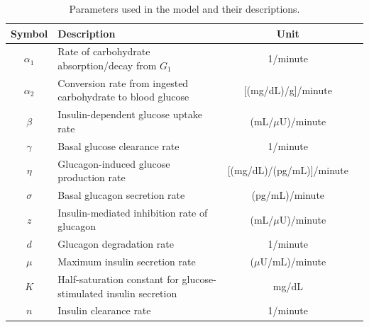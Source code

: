 \documentclass[a4paper,fleqn]{cas-sc}
\numberwithin{equation}{section}
\numberwithin{equation}{section}
\newcommand{\1}{\boldsymbol{1}}
\newcommand{\0}{\boldsymbol{0}}
\begin{document}

\begin{table}[H]
    \centering
    \begin{tabular}{cp{9cm}cc}
        \hline
        \textbf{Symbol} & \textbf{Description} & \textbf{Unit} \\
        \hline
        $\alpha_1$ & Rate of carbohydrate absorption/decay from $G_1$ & 1/minute \\

        $\alpha_2$ & Conversion rate from ingested carbohydrate to blood glucose & [(mg/dL)/g]/minute \\

        $\beta$ & Insulin-dependent glucose uptake rate & (mL/\(\mu\)U)/minute \\

        $\gamma$ & Basal glucose clearance rate & 1/minute \\

        $\eta$ & Glucagon-induced glucose production rate & [(mg/dL)/(pg/mL)]/minute \\

        $\sigma$ & Basal glucagon secretion rate & (pg/mL)/minute \\

        $z$ & Insulin-mediated inhibition rate of glucagon & (mL/\(\mu\)U)/minute \\

        $d$ & Glucagon degradation rate & 1/minute \\

        $\mu$ & Maximum insulin secretion rate & (\(\mu\)U/mL)/minute \\

        $K$ & Half-saturation constant for glucose-stimulated insulin secretion & mg/dL \\

        $n$ & Insulin clearance rate & 1/minute \\
        \hline
    \end{tabular}
    \caption{Parameters used in the model and their descriptions.}
    \label{table:parameters}
\end{table}
\end{document}
